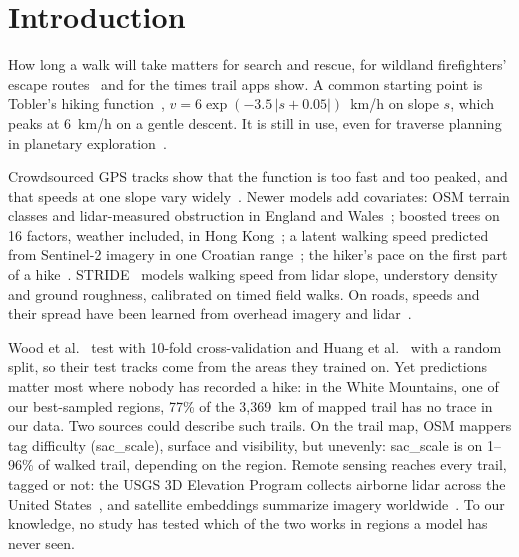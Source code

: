 \section{Introduction}
\label{sec:intro}


How long a walk will take matters for search and rescue, for wildland
firefighters' escape routes~\cite{campbell2017lidar} and for the times
trail apps show. A common starting point is Tobler's hiking
function~\cite{tobler1993}, $v = 6\exp(-3.5\,|s + 0.05|)$~km/h on slope
$s$, which peaks at 6~km/h on a gentle descent. It is still in use, even
for traverse planning in planetary exploration~\cite{goodwin2025application}.

Crowdsourced GPS tracks show that the function is too fast and too peaked,
and that speeds at one slope vary
widely~\cite{campbell2019crowdsourced,campbell2022variability}. Newer models
add covariates: OSM terrain classes and lidar-measured obstruction in
England and Wales~\cite{wood2023hiking}; boosted trees on 16 factors,
weather included, in Hong Kong~\cite{huang2026modeling}; a latent walking
speed predicted from Sentinel-2 imagery in one Croatian
range~\cite{seric2022modeling}; the hiker's pace on the first part of a
hike~\cite{asako2024hikingtte}. STRIDE~\cite{campbell2024stride} models
walking speed from lidar slope, understory
density~\cite{campbell2018understory} and ground roughness, calibrated on
timed field walks. On roads, speeds and their spread have been learned from
overhead imagery and
lidar~\cite{hadzic2020rasternet,workman2024probabilistic}.

Wood et al.~\cite{wood2023hiking} test with 10-fold cross-validation and
Huang et al.~\cite{huang2026modeling} with a random split, so their test
tracks come from the areas they trained on. Yet predictions matter most where
nobody has recorded a hike: in the White Mountains, one of our best-sampled
regions, 77\% of the 3,369~km of mapped trail has no trace in our data. Two
sources could describe such trails. On the trail map, OSM mappers tag
difficulty (sac\_scale), surface and visibility, but unevenly: sac\_scale
is on 1--96\% of walked trail, depending on the region. Remote sensing
reaches every trail, tagged or not: the USGS 3D Elevation Program collects
airborne lidar across the United States~\cite{sugarbaker2017status}, and
satellite embeddings summarize imagery worldwide~\cite{brown2025alphaearth}.
To our knowledge, no study has tested which of the two works in regions a
model has never seen.

